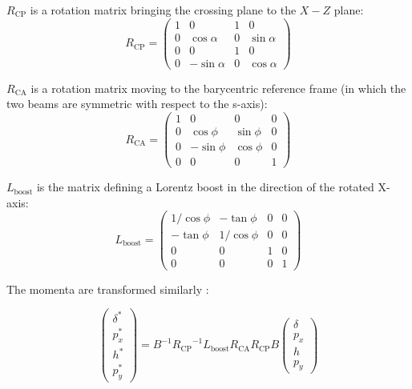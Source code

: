 \begin{appendices}
$R_{\mathrm{CP}}$ is a rotation matrix bringing the crossing plane to the $X-Z$ plane:
\begin{equation}
R_{\mathrm{CP}}=
\left( \begin{matrix}
1 &0 &1&0\\
0 &\cos\alpha &0&\sin\alpha\\
0 &0 &1&0\\
0 &-\sin\alpha &0&\cos\alpha
\end{matrix} \right) 
\end{equation}

$R_{\mathrm{CA}}$ is a rotation matrix moving to the barycentric reference frame (in which the two beams are symmetric with respect to the s-axis):
\begin{equation}
R_{\mathrm{CA}}=
\left( \begin{matrix}
1 &0 &0&0\\
0 &\cos\phi&\sin\phi &0\\
0 &-\sin\phi&\cos\phi &0\\
0 &0 &0&1
\end{matrix} \right) 
\end{equation}

$L_{\mathrm{boost}}$ is the matrix defining a Lorentz boost in the direction of the rotated X-axis:
\begin{equation}
L_{\mathrm{boost}}=
\left( \begin{matrix}
1/\cos\phi &-\tan\phi &0&0\\
-\tan\phi &1/\cos\phi&0 &0\\
0 &0&1 &0\\
0 &0 &0&1
\end{matrix} \right) 
\end{equation}

The momenta are transformed similarly \cite{beam_beam}:

\begin{equation}
\left( \begin{matrix}
\delta^*\\
p_x^*\\
h^*\\
p_y^*
\end{matrix} \right) = 
B^{-1}{R_{\mathrm{CP}}}^{-1}L_{\mathrm{boost}}R_{\mathrm{CA}}R_{\mathrm{CP}}B
\left( \begin{matrix}
\delta\\
p_x\\
h\\
p_y
\end{matrix} \right) 
\end{equation}


\end{appendices}
